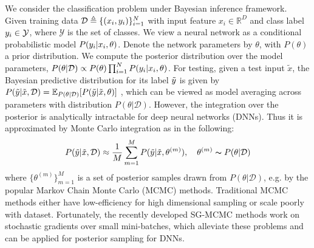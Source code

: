 \documentclass{article} %
\begin{document}
We consider the classification problem under Bayesian inference framework.
Given training data 
$ \mathcal{D} \triangleq \{(x_i,\mathnormal{y}_{i})\}_{i=1}^N $ 
with input feature 
$ x_{i} \in \mathbb{R}^{D} $ and class label
$ \mathnormal{y}_{i} \in \mathcal{Y} $, where $\mathcal{Y}$ is the set of classes.
We view a neural network as a conditional probabilistic model $P(\mathnormal{y}_i|x_i,\theta)$. 
Denote the network parameters by $\theta$, with $ P(\theta) $ a prior distribution.
We compute the posterior distribution over the model parameters,
$ P(\theta|\mathcal{D}) \propto P(\theta) \prod_{i=1}^{N}P(\mathnormal{y}_i|x_i,\theta) $.
For testing, given a test input $ \tilde{x} $, the Bayesian predictive distribution for its label $ \tilde{\mathnormal{y}} $ is given by 
$ P(\tilde{\mathnormal{y}}|\tilde{x},\mathcal{D}) =
\mathbb{E}_{P(\theta|\mathcal{D})}
[P(\tilde{\mathnormal{y}}|\tilde{x},\theta)] $
, which can be viewed as model averaging across parameters with distribution $ P(\theta|\mathcal{D}) $. 
However, the integration over the posterior is analytically intractable for deep neural networks (DNNs). 
Thus it is approximated by Monte Carlo integration as in the following:
\begin{equation} 
\label{eq1}
P(\tilde{\mathnormal{y}}|\tilde{x},\mathcal{D}) \approx
\frac{1}{M} \sum_{m=1}^{M} P(\tilde{\mathnormal{y}}|\tilde{x},\theta^{(m)})
,\quad \theta^{(m)} \thicksim P(\theta|\mathcal{D})
\end{equation}
where $ \{\theta^{(m)}\}_{m=1}^M $ is a set of  posterior samples drawn from $ P(\theta|\mathcal{D}) $, e.g. by the popular Markov Chain Monte Carlo (MCMC) methods. Traditional MCMC methods either have low-efficiency for high dimensional sampling or scale poorly with dataset. Fortunately, the recently developed SG-MCMC methods work on stochastic gradients over small mini-batches, which alleviate these problems and can be applied for posterior sampling for DNNs.
\end{document}
